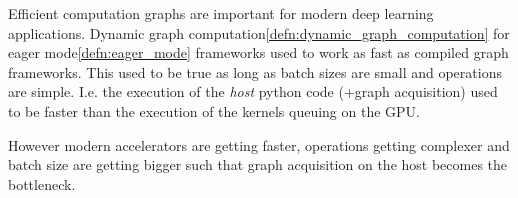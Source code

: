 \begin{sectionbox}\nospacing
        Efficient computation graphs are important for modern deep learning applications.
        Dynamic graph computation\cref{defn:dynamic_graph_computation} for eager mode\cref{defn:eager_mode} frameworks used to work as fast as compiled graph frameworks.
        This used to be true as long as batch sizes are small and operations are simple.
        I.e. the execution of the \textit{host} python code (+graph acquisition) used to be faster than the execution of the kernels queuing on the GPU.

        However modern accelerators are getting faster, operations getting complexer and batch size are getting bigger such that graph acquisition on the host becomes the bottleneck.
\end{sectionbox}

